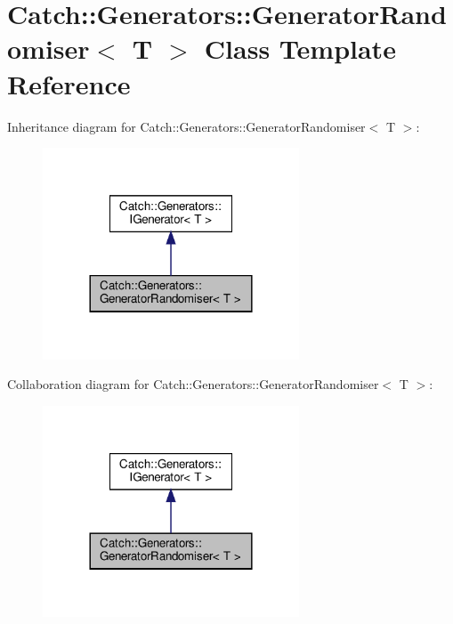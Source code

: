 \hypertarget{classCatch_1_1Generators_1_1GeneratorRandomiser}{}\section{Catch\+::Generators\+::Generator\+Randomiser$<$ T $>$ Class Template Reference}
\label{classCatch_1_1Generators_1_1GeneratorRandomiser}


Inheritance diagram for Catch\+::Generators\+::Generator\+Randomiser$<$ T $>$\+:
\nopagebreak
\begin{figure}[H]
\begin{center}
\leavevmode
\includegraphics[width=216pt]{classCatch_1_1Generators_1_1GeneratorRandomiser__inherit__graph}
\end{center}
\end{figure}


Collaboration diagram for Catch\+::Generators\+::Generator\+Randomiser$<$ T $>$\+:
\nopagebreak
\begin{figure}[H]
\begin{center}
\leavevmode
\includegraphics[width=216pt]{classCatch_1_1Generators_1_1GeneratorRandomiser__coll__graph}
\end{center}
\end{figure}

